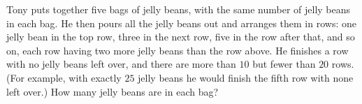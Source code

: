 Tony puts together five bags of jelly beans, with the same number of jelly beans in each bag. He then pours all the jelly beans out and arranges them in rows: one jelly bean in the top row, three in the next row, five in the row after that, and so on, each row having two more jelly beans than the row above. He finishes a row with no jelly beans left over, and there are more than $10$ but fewer than $20$ rows. (For example, with exactly $25$ jelly beans he would finish the fifth row with none left over.) How many jelly beans are in each bag?
